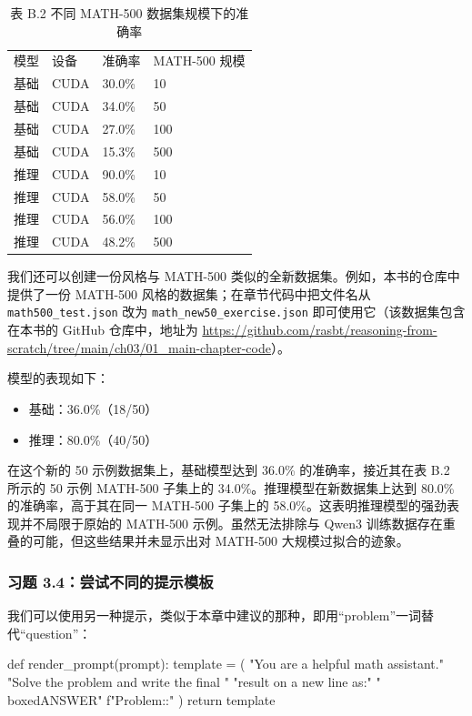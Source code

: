 \begin{table}[htbp]
\centering\small
\centering
\caption{表 B.2 不同 MATH-500 数据集规模下的准确率}
\begin{tabularx}{\linewidth}{XXXX}
\toprule
模型 & 设备 & 准确率 & MATH-500 规模 \\
基础 & CUDA & 30.0\% & 10 \\
基础 & CUDA & 34.0\% & 50 \\
基础 & CUDA & 27.0\% & 100 \\
基础 & CUDA & 15.3\% & 500 \\
推理 & CUDA & 90.0\% & 10 \\
推理 & CUDA & 58.0\% & 50 \\
推理 & CUDA & 56.0\% & 100 \\
推理 & CUDA & 48.2\% & 500 \\ \bottomrule
\end{tabularx}
\end{table}

我们还可以创建一份风格与 MATH-500 类似的全新数据集。例如，本书的仓库中提供了一份 MATH-500 风格的数据集；在章节代码中把文件名从 \texttt{math500\_test.json} 改为 \texttt{math\_new50\_exercise.json} 即可使用它（该数据集包含在本书的 GitHub 仓库中，地址为 \href{https://github.com/rasbt/reasoning-from-scratch/tree/main/ch03/01\_main-chapter-code}{https://github.com/rasbt/reasoning-from-scratch/tree/main/ch03/01\_main-chapter-code}）。

模型的表现如下：

\begin{itemize}
\item 基础：36.0\%（18/50）
\item 推理：80.0\%（40/50）
\end{itemize}

在这个新的 50 示例数据集上，基础模型达到 36.0\% 的准确率，接近其在表 B.2 所示的 50 示例 MATH-500 子集上的 34.0\%。推理模型在新数据集上达到 80.0\% 的准确率，高于其在同一 MATH-500 子集上的 58.0\%。这表明推理模型的强劲表现并不局限于原始的 MATH-500 示例。虽然无法排除与 Qwen3 训练数据存在重叠的可能，但这些结果并未显示出对 MATH-500 大规模过拟合的迹象。

\subsubsection*{习题 3.4：尝试不同的提示模板}

我们可以使用另一种提示，类似于本章中建议的那种，即用“problem”一词替代“question”：

\begin{codebox}
def render_prompt(prompt):
    template = (
        "You are a helpful math assistant.\n"
        "Solve the problem and write the final "
        "result on a new line as:\n"
        "\\boxed{ANSWER}\n\n"
        f"Problem:\n\nAnswer:"
    )
    return template
\end{codebox}

